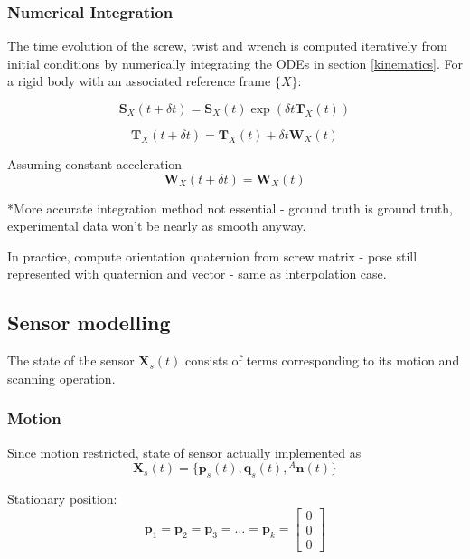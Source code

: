 \subsubsection{Numerical Integration} \label{integration}
The time evolution of the screw, twist and wrench is computed iteratively from initial conditions by numerically integrating the ODEs in section \ref{kinematics}. For a rigid body with an associated reference frame $\{X\}$:

\begin{equation}
	\mathbf{S}_X(t+\delta t) = \mathbf{S}_X(t)\exp({\delta t {\mathbf{T}_X(t)}})
\end{equation}

\begin{equation}
	\mathbf{T}_X(t+\delta t) = \mathbf{T}_X(t) + \delta t \mathbf{W}_X(t)
\end{equation}

Assuming constant acceleration
\begin{equation}
	\mathbf{W}_X(t+\delta t) =\mathbf{W}_X(t)
\end{equation}

*More accurate integration method not essential - ground truth is ground truth, experimental data won't be nearly as smooth anyway.

In practice, compute orientation quaternion from screw matrix - pose still represented with quaternion and vector - same as interpolation case.

\subsection{Sensor modelling}
The state of the sensor $\mathbf{X}_{s}(t)$ consists of terms corresponding to its motion and scanning operation. 

\subsubsection{Motion}
Since motion restricted, state of sensor actually implemented as 
\begin{equation}
	\mathbf{X}_{s}(t) = \{\mathbf{p}_s(t),\mathbf{q}_s(t),{^{A}\mathbf{n}(t)}\}
\end{equation}

Stationary position:
\begin{equation}
	\mathbf{p}_1 = \mathbf{p}_2 = \mathbf{p}_3 = \dots =  \mathbf{p}_k = 
	\begin{bmatrix}
		0 \\ 0 \\ 0
   	\end{bmatrix}
\end{equation}

